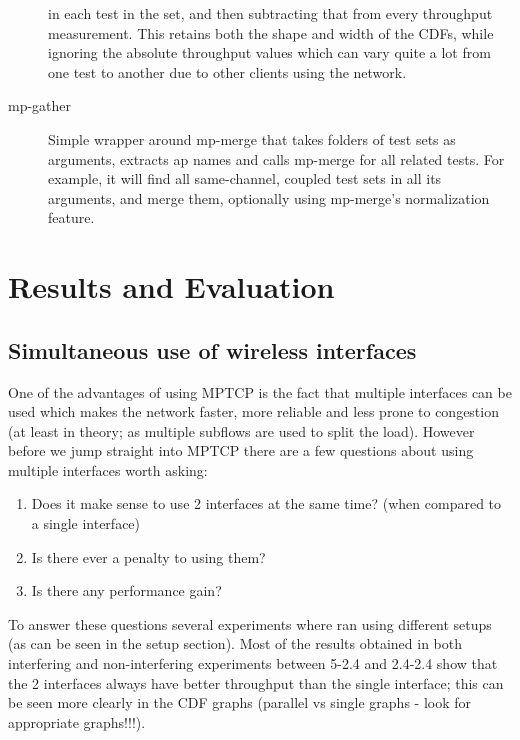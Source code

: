 \documentclass[12pt,a4paper]{article}
\begin{document}
\begin{description}
    in each test in the set, and then subtracting that from every throughput
    measurement. This retains both the shape and width of the CDFs, while
    ignoring the absolute throughput values which can vary quite a lot from one
    test to another due to other clients using the network.
  \item[mp-gather]
    Simple wrapper around mp-merge that takes folders of test sets as arguments,
    extracts ap names and calls mp-merge for all related tests. For example, it
    will find all same-channel, coupled test sets in all its arguments, and
    merge them, optionally using mp-merge's normalization feature.
\end{description}

\section{Results and Evaluation}
\subsection{Simultaneous use of wireless interfaces}
One of the advantages of using MPTCP is the fact that multiple interfaces can be
used which makes the network faster, more reliable and less prone to congestion
(at least in theory; as multiple subflows are used to split the load). However
before we jump straight into MPTCP there are a few questions about using
multiple interfaces worth asking:

\begin{enumerate}
  \item Does it make sense to use 2 interfaces at the same time? (when compared
    to a single interface)
  \item Is there ever a penalty to using them?
  \item Is there any performance gain?
\end{enumerate}

To answer these questions several experiments where ran using different setups
(as can be seen in the setup section). Most of the results obtained in both
interfering and non-interfering experiments between 5-2.4 and 2.4-2.4 show that
the 2 interfaces always have better throughput than the single interface; this
can be seen more clearly in the CDF graphs (parallel vs single graphs - look for
appropriate graphs!!!).

\end{document}
